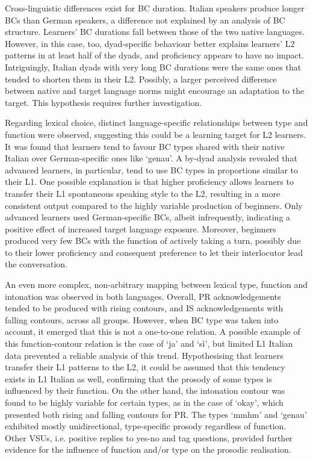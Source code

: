 Cross-linguistic differences exist for BC duration. Italian speakers produce longer BCs than German speakers, a difference not explained by an analysis of BC structure. Learners' BC durations fall between those of the two native languages. However, in this case, too, dyad-specific behaviour better explains learners’ L2 patterns in at least half of the dyads, and proficiency appears to have no impact. Intriguingly, Italian dyads with very long BC durations were the same ones that tended to shorten them in their L2. Possibly, a larger perceived difference between native and target language norms might encourage an adaptation to the target. This hypothesis requires further investigation.

Regarding lexical choice, distinct language-specific relationships between type and function were observed, suggesting this could be a learning target for L2 learners. It was found that learners tend to favour BC types shared with their native Italian over German-specific ones like ‘genau’. A by-dyad analysis revealed that advanced learners, in particular, tend to use BC types in proportions similar to their L1. One possible explanation is that higher proficiency allows learners to transfer their L1 spontaneous speaking style to the L2, resulting in a more consistent output compared to the highly variable production of beginners. Only advanced learners used German-specific BCs, albeit infrequently, indicating a positive effect of increased target language exposure. Moreover, beginners produced very few BCs with the function of actively taking a turn, possibly due to their lower proficiency and consequent preference to let their interlocutor lead the conversation.

An even more complex, non-arbitrary mapping between lexical type, function and intonation was observed in both languages. Overall, PR acknowledgements tended to be produced with rising contours, and IS acknowledgements with falling contours, across all groups. However, when BC type was taken into account, it emerged that this is not a one-to-one relation. A possible example of this function-contour relation is the case of ‘ja’ and ‘sì’, but limited L1 Italian data prevented a reliable analysis of this trend. Hypothesising that learners transfer their L1 patterns to the L2, it could be assumed that this tendency exists in L1 Italian as well, confirming that the prosody of some types is influenced by their function. On the other hand, the intonation contour was found to be highly variable for certain types, as in the case of ‘okay’, which presented both rising and falling contours for PR. The types ‘mmhm’ and ‘genau’ exhibited mostly unidirectional, type-specific prosody regardless of function. Other VSUs, i.e. positive replies to yes-no and tag questions, provided further evidence for the influence of function and/or type on the prosodic realisation.

